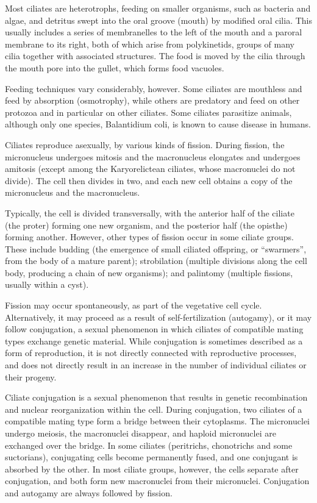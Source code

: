 Most ciliates are heterotrophs, feeding on smaller organisms, such as bacteria and algae, and detritus swept into the oral groove (mouth) by modified oral cilia. This usually includes a series of membranelles to the left of the mouth and a paroral membrane to its right, both of which arise from polykinetids, groups of many cilia together with associated structures. The food is moved by the cilia through the mouth pore into the gullet, which forms food vacuoles.

Feeding techniques vary considerably, however. Some ciliates are mouthless and feed by absorption (osmotrophy), while others are predatory and feed on other protozoa and in particular on other ciliates. Some ciliates parasitize animals, although only one species, Balantidium coli, is known to cause disease in humans.

Ciliates reproduce asexually, by various kinds of fission. During fission, the micronucleus undergoes mitosis and the macronucleus elongates and undergoes amitosis (except among the Karyorelictean ciliates, whose macronuclei do not divide). The cell then divides in two, and each new cell obtains a copy of the micronucleus and the macronucleus.

Typically, the cell is divided transversally, with the anterior half of the ciliate (the proter) forming one new organism, and the posterior half (the opisthe) forming another. However, other types of fission occur in some ciliate groups. These include budding (the emergence of small ciliated offspring, or ``swarmers'', from the body of a mature parent); strobilation (multiple divisions along the cell body, producing a chain of new organisms); and palintomy (multiple fissions, usually within a cyst).

Fission may occur spontaneously, as part of the vegetative cell cycle. Alternatively, it may proceed as a result of self-fertilization (autogamy), or it may follow conjugation, a sexual phenomenon in which ciliates of compatible mating types exchange genetic material. While conjugation is sometimes described as a form of reproduction, it is not directly connected with reproductive processes, and does not directly result in an increase in the number of individual ciliates or their progeny.

Ciliate conjugation is a sexual phenomenon that results in genetic recombination and nuclear reorganization within the cell. During conjugation, two ciliates of a compatible mating type form a bridge between their cytoplasms. The micronuclei undergo meiosis, the macronuclei disappear, and haploid micronuclei are exchanged over the bridge. In some ciliates (peritrichs, chonotrichs and some suctorians), conjugating cells become permanently fused, and one conjugant is absorbed by the other. In most ciliate groups, however, the cells separate after conjugation, and both form new macronuclei from their micronuclei. Conjugation and autogamy are always followed by fission.



